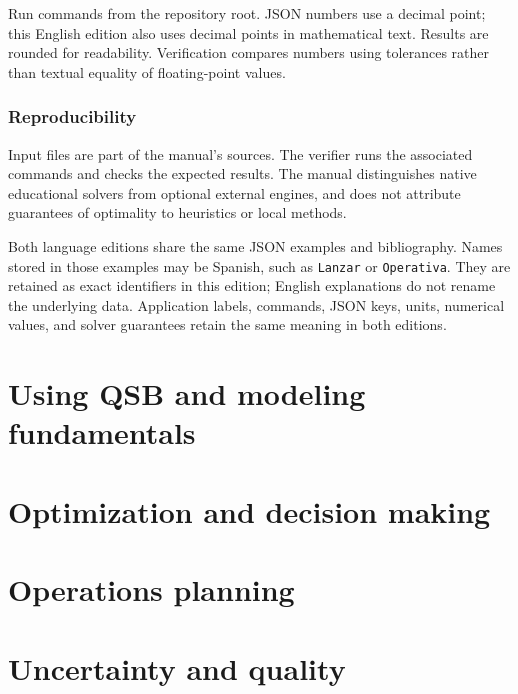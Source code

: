 \documentclass[11pt,openany]{book}
\theoremstyle{definition}
\begin{document}
Run commands from the repository root. JSON numbers use a decimal point; this
English edition also uses decimal points in mathematical text. Results are
rounded for readability. Verification compares numbers using tolerances rather
than textual equality of floating-point values.

\section*{Reproducibility}
Input files are part of the manual's sources. The verifier runs the associated
commands and checks the expected results. The manual distinguishes native
educational solvers from optional external engines, and does not attribute
guarantees of optimality to heuristics or local methods.

Both language editions share the same JSON examples and bibliography. Names
stored in those examples may be Spanish, such as \texttt{Lanzar} or
\texttt{Operativa}. They are retained as exact identifiers in this edition;
English explanations do not rename the underlying data. Application labels,
commands, JSON keys, units, numerical values, and solver guarantees retain the
same meaning in both editions.

\tableofcontents
\listoftables

\mainmatter

\part{Using QSB and modeling fundamentals}



\part{Optimization and decision making}






\part{Operations planning}





\part{Uncertainty and quality}





\appendix


\backmatter


\end{document}

